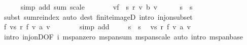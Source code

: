 \begin{isabellebody}
\ \ \ \ \isamarkupfalse%
\ {\isacharparenleft}{\kern0pt}simp\ add{\isacharcolon}{\kern0pt}\ sum\ scale{\isacharparenright}{\kern0pt}\isanewline
\ \ \isamarkupfalse%
\ \isamarkupfalse%
\ {\isachardoublequoteopen}{\isachardot}{\kern0pt}{\isachardot}{\kern0pt}{\isachardot}{\kern0pt}\ {\isacharequal}{\kern0pt}\ {\isacharparenleft}{\kern0pt}{\isasymSum}v{\isasymin}f\ {\isacharbackquote}{\kern0pt}\ s{\isacharprime}{\kern0pt}{\isachardot}{\kern0pt}\ r\ v\ {\isacharasterisk}{\kern0pt}b\ v{\isacharparenright}{\kern0pt}{\isachardoublequoteclose}\isanewline
\ \ \ \ \isamarkupfalse%
\ {\isacartoucheopen}s{\isacharprime}{\kern0pt}\ {\isasymsubseteq}\ s{\isacartoucheclose}\ \isamarkupfalse%
\ {\isacharparenleft}{\kern0pt}subst\ sum{\isachardot}{\kern0pt}reindex{\isacharparenright}{\kern0pt}\ {\isacharparenleft}{\kern0pt}auto\ dest{\isacharbang}{\kern0pt}{\isacharcolon}{\kern0pt}\ finite{\isacharunderscore}{\kern0pt}imageD\ intro{\isacharcolon}{\kern0pt}\ inj{\isacharunderscore}{\kern0pt}on{\isacharunderscore}{\kern0pt}subset{\isacharparenright}{\kern0pt}\isanewline
\ \ \isamarkupfalse%
\ \isamarkupfalse%
\ {\isachardoublequoteopen}f\ {\isacharparenleft}{\kern0pt}{\isasymSum}v{\isasymin}s{\isacharprime}{\kern0pt}{\isachardot}{\kern0pt}\ r\ {\isacharparenleft}{\kern0pt}f\ v{\isacharparenright}{\kern0pt}\ {\isacharasterisk}{\kern0pt}a\ v{\isacharparenright}{\kern0pt}\ {\isacharequal}{\kern0pt}\ {}{\isachardoublequoteclose}\isanewline
\ \ \ \ \isamarkupfalse%
\ {\isacharparenleft}{\kern0pt}simp\ add{\isacharcolon}{\kern0pt}\ {\isacharasterisk}{\kern0pt}{\isacharparenright}{\kern0pt}\isanewline
\ \ \isamarkupfalse%
\ {\isacartoucheopen}s{\isacharprime}{\kern0pt}\ {\isasymsubseteq}\ s{\isacartoucheclose}\ \isamarkupfalse%
\ {\isachardoublequoteopen}{\isacharparenleft}{\kern0pt}{\isasymSum}v{\isasymin}s{\isacharprime}{\kern0pt}{\isachardot}{\kern0pt}\ r\ {\isacharparenleft}{\kern0pt}f\ v{\isacharparenright}{\kern0pt}\ {\isacharasterisk}{\kern0pt}a\ v{\isacharparenright}{\kern0pt}\ {\isacharequal}{\kern0pt}\ {}{\isachardoublequoteclose}\isanewline
\ \ \ \ \isamarkupfalse%
\ {\isacharparenleft}{\kern0pt}intro\ inj{\isacharunderscore}{\kern0pt}onD{\isacharbrackleft}{\kern0pt}OF\ i{\isacharbrackright}{\kern0pt}\ m{}{\isachardot}{\kern0pt}span{\isacharunderscore}{\kern0pt}zero\ m{}{\isachardot}{\kern0pt}span{\isacharunderscore}{\kern0pt}sum\ m{}{\isachardot}{\kern0pt}span{\isacharunderscore}{\kern0pt}scale{\isacharparenright}{\kern0pt}\ {\isacharparenleft}{\kern0pt}auto\ intro{\isacharcolon}{\kern0pt}\ m{}{\isachardot}{\kern0pt}span{\isacharunderscore}{\kern0pt}base{\isacharparenright}{\kern0pt}\isanewline

\end{isabellebody}
